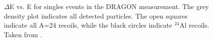 \begin{figure}
\begin{center}
\caption{$\Delta$E vs. E for singles events in the DRAGON  measurement. The grey density plot indicates all detected particles. The open squares indicate all A=24 recoils, while the black circles indicate $^{24}$Al recoils. Taken from \cite{eri10}.}
\label{fig:Mg23_dE_E}
\end{center}
\end{figure}

